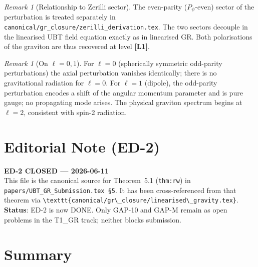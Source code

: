 \documentclass[12pt,a4paper]{article}
\theoremstyle{definition}
\theoremstyle{remark}
\newtheorem{remark}[theorem]{Remark}
\newcommand{\Lone}{\textbf{[L1]}}
\begin{document}
\begin{remark}[Relationship to Zerilli sector]
The even-parity ($P_\psi$-even) sector of the perturbation is treated
separately in \texttt{canonical/gr\_closure/zerilli\_derivation.tex}.
The two sectors decouple in the linearised UBT field equation exactly as in
linearised GR.  Both polarisations of the graviton are thus recovered at level
\Lone.
\end{remark}

\begin{remark}[On $\ell = 0, 1$]
For $\ell = 0$ (spherically symmetric odd-parity perturbations) the axial
perturbation vanishes identically; there is no gravitational radiation for
$\ell = 0$.  For $\ell = 1$ (dipole), the odd-parity perturbation encodes a
shift of the angular momentum parameter and is pure gauge; no propagating mode
arises.  The physical graviton spectrum begins at $\ell = 2$, consistent with
spin-2 radiation.
\end{remark}

\section{Editorial Note (ED-2)}
\label{sec:editorial}

\begin{resultbox}
\textbf{ED-2 CLOSED — 2026-06-11}\\[4pt]
This file is the canonical source for Theorem~5.1 (\texttt{thm:rw}) in
\texttt{papers/UBT\_GR\_Submission.tex §5}.  It has been cross-referenced from
that theorem via
\verb|\texttt{canonical/gr\_closure/linearised\_gravity.tex}|.\\[4pt]
\textbf{Status}: ED-2 is now DONE.  Only GAP-10 and GAP-M remain as open
problems in the T1\_GR track; neither blocks submission.
\end{resultbox}

\section{Summary}
\label{sec:summary}
\end{document}
